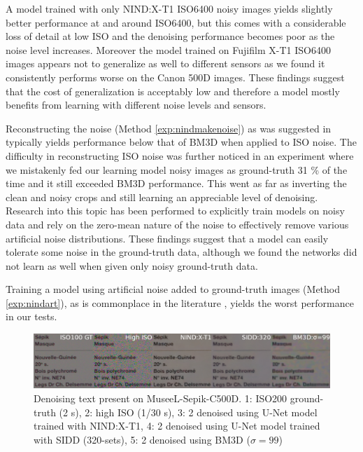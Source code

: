 A model trained with only \ac{NIND}:\ac{X-T1} ISO6400 noisy images yields slightly better performance at and around ISO6400, but this comes with a considerable loss of detail at low ISO and the denoising performance becomes poor as the noise level increases. Moreover the model trained on Fujifilm \acs{X-T1} ISO6400 images appears not to generalize as well to different sensors as we found it consistently performs worse on the Canon 500D images. These findings suggest that the cost of generalization is acceptably low and therefore a model mostly benefits from learning with different noise levels and sensors.

Reconstructing the noise (Method \ref{exp:nindmakenoise}) as was suggested in \cite{dncnn} typically yields performance below that of \ac{BM3D} when applied to ISO noise. The difficulty in reconstructing ISO noise was further noticed in an experiment where we mistakenly fed our learning model noisy images as ground-truth 31 \% of the time and it still exceeded \ac{BM3D} performance. This went as far as inverting the clean and noisy crops and still learning an appreciable level of denoising. Research into this topic \cite{noise2noise} has been performed to explicitly train models on noisy data and rely on the zero-mean nature of the noise to effectively remove various artificial noise distributions. These findings suggest that a model can easily tolerate some noise in the ground-truth data, although we found the networks did not learn as well when given only noisy ground-truth data.

Training a model using artificial noise added to ground-truth images (Method \ref{exp:nindart}), as is commonplace in the literature \cite{rednet}\cite{dncnn}, yields the worst performance in our tests.

\begin{figure}[!htbp]
\centering
\includegraphics[width=1\linewidth]{gfx/comp/txt.jpg}
\caption[Denoising text present on MuseeL-Sepik-C500D (visual comparison)]{Denoising text present on MuseeL-Sepik-C500D. 1: ISO200 ground-truth (2 s), 2: high ISO (1/30 s), 3: 2 denoised using U-Net model trained with \acs{NIND}:\acs{X-T1}, 4: 2 denoised using U-Net model trained with \ac{SIDD} (320-sets), 5: 2 denoised using \acs{BM3D} ($\sigma=99$)}
\label{fig:text}
\end{figure}

